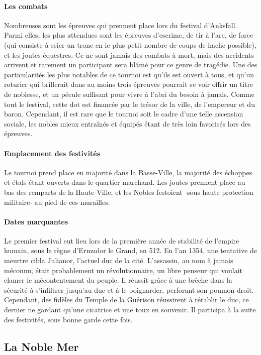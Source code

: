 \paragraph{Les combats}
Nombreuses sont les épreuves qui prennent place lors du festival d'Anksfall. Parmi elles, les plus attendues sont les épreuves d'escrime, de tir à l'arc, de force (qui consiste à scier un tronc en le plus petit nombre de coups de hache possible), et les joutes équestres. Ce ne sont jamais des combats à mort, mais des accidents arrivent et rarement un participant sera blâmé pour ce genre de tragédie.
\newline
Une des particularités les plus notables de ce tournoi est qu'ils est ouvert à tous, et qu'un roturier qui brillerait dans au moins trois épreuves pourrait se voir offrir un titre de noblesse, et un pécule suffisant pour vivre à l'abri du besoin à jamais. Comme tout le festival, cette dot est financée par le trésor de la ville, de l'empereur et du baron. Cependant, il est rare que le tournoi soit le cadre d'une telle ascension sociale, les nobles mieux entraînés et équipés étant de très loin favorisés lors des épreuves.
\paragraph{Emplacement des festivités}
Le tournoi prend place en majorité dans la Basse-Ville, la majorité des échoppes et étals étant ouverts dans le quartier marchand. Les joutes prennent place au bas des remparts de la Haute-Ville, et les Nobles festoient -sous haute protection militaire- au pied de ces murailles.
\paragraph{Dates marquantes}
Le premier festival eut lieu lors de la première année de stabilité de l'empire humain, sous le règne d'Ermudor le Grand, en 512. En l'an 1354, une tentative de meurtre cibla Julianor, l'actuel duc de la cité. L'assassin, au nom à jamais méconnu, était probablement un révolutionnaire, un libre penseur qui voulait clamer le mécontentement du peuple. Il réussit grâce à une brèche dans la sécurité à s'infiltrer jusqu'au duc et à le poignarder, perforant son poumon droit. Cependant, des fidèles du Temple de la Guérison réussirent à rétablir le duc, ce dernier ne gardant qu'une cicatrice et une toux en souvenir. Il participa à la suite des festivités, sous bonne garde cette fois.
\subsection{La Noble Mer}
